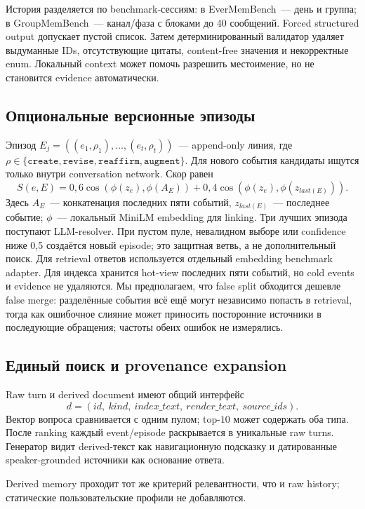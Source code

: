 \documentclass[11pt,a4paper]{article}
\begin{document}
История разделяется по benchmark-сессиям: в
EverMemBench~--- день и группа; в GroupMemBench~--- канал/фаза с блоками до 40
сообщений. Forced structured output допускает пустой список. Затем
детерминированный валидатор удаляет выдуманные IDs, отсутствующие цитаты,
content-free значения и некорректные enum. Локальный context может помочь
разрешить местоимение, но не становится evidence автоматически.

\subsection{Опциональные версионные эпизоды}

Эпизод $E_j=((e_1,\rho_1),\ldots,(e_t,\rho_t))$~--- append-only линия, где
$\rho\in\{\texttt{create},\texttt{revise},\texttt{reaffirm},\texttt{augment}\}$.
Для нового события кандидаты ищутся только внутри conversation network.
Скор равен
\[
S(e,E)=0{,}6\cos(\phi(z_e),\phi(A_E))+0{,}4\cos(\phi(z_e),\phi(z_{last(E)})).
\]
Здесь $A_E$~--- конкатенация последних пяти событий, $z_{last(E)}$~---
последнее событие; $\phi$~--- локальный MiniLM embedding для linking.
Три лучших эпизода поступают LLM-resolver. При пустом пуле, невалидном выборе
или confidence ниже 0,5 создаётся новый episode; это защитная ветвь, а не
дополнительный поиск. Для retrieval ответов используется отдельный embedding
benchmark adapter. Для индекса хранится hot-view последних пяти событий,
но cold events и evidence не удаляются. Мы предполагаем, что false split обходится
дешевле false merge: разделённые события всё ещё могут независимо попасть в
retrieval, тогда как ошибочное слияние может приносить посторонние источники в
последующие обращения; частоты обеих ошибок не измерялись.

\subsection{Единый поиск и provenance expansion}

Raw turn и derived document имеют общий интерфейс
\[
d=(id,\ kind,\ index\_text,\ render\_text,\ source\_ids).
\]
Вектор вопроса
сравнивается с одним пулом; top-$10$ может содержать оба типа. После ranking
каждый event/episode раскрывается в уникальные raw turns. Генератор видит
derived-текст как навигационную подсказку и датированные speaker-grounded
источники как основание ответа.

Derived memory проходит тот же критерий релевантности, что и raw history;
статические пользовательские профили не добавляются.
\end{document}

